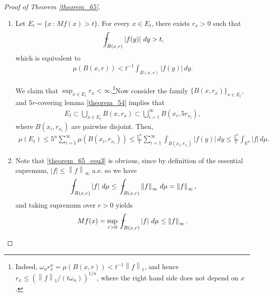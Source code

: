 \documentclass[11pt]{book}
\theoremstyle{definition}
\numberwithin{equation}{chapter}
\def\avint{\,\ThisStyle{\ensurestackMath{%
  \stackinset{c}{.2\LMpt}{c}{1\LMpt}{\SavedStyle-}{\SavedStyle\phantom{\int}}}%
  \setbox0=\hbox{$\SavedStyle\int\,$}\kern-\wd0}\int}
\begin{document}
\begin{proof}[Proof of Theorem \ref{theorem_65}]
~\begin{enumerate}[label=(\alph*)]
    \item Let $E_t = \{x \,:\, Mf(x) > t\}$. For every $x \in E_t$, there exists $r_x > 0$ such that
    \begin{align*}
        \avint_{B(x,r)} \left|f(y)\right| \,dy > t,
    \end{align*}
    which is equivalent to 
    \begin{align*}
        \mu(B(x,r)) < t^{-1} \int_{B(x,r)} \left|f(y)\right| \,dy.
    \end{align*}
    
    We claim that $\sup_{x \in E_t} r_x < \infty$.\footnote{Indeed, $\omega_n r_x^n = \mu(B(x,r)) < t^{-1} \left\|f\right\|_1$, and hence $r_x \leq \left(\left\|f\right\|_1/(t\omega_n)\right)^{1/n}$, where the right hand side does not depend on $x$.}Now consider the family $\{B(x,r_x)\}_{x \in E_t}$, and $5r$-covering lemma \ref{theorem_54} implies that 
    \begin{align*}
        E_t \subset \bigcup_{x\in E_t} B(x,r_x) \subset \bigcup^\infty_{i=1} B(x_i,5r_{x_i}),
    \end{align*}
    where $B(x_i,r_{x_i})$ are pairwise disjoint. Then,
    \begin{align*}
        \mu(E_t) \leq 5^n \sum^\infty_{i=1} \mu(B(x_i,r_{x_i})) \leq \frac{5^n}{t} \sum^\infty_{i=1} \int_{B(x_i,r_{x_i})} \left|f(y)\right| \,dy \leq \frac{5^n}{t} \int_{\mathbb{R}^n} \left|f\right| \,d\mu.
    \end{align*}
    
    \item Note that \eqref{theorem_65_equ3} is obvious, since by definition of the essential supremum, $\left|f\right| \leq \left\|f\right\|_\infty$ a.e. so we have
    \begin{align*}
        \avint_{B(x,r)} \left|f\right| \,d\mu \leq \avint_{B(x,r)} \left\|f\right\|_\infty \,d\mu = \left\|f\right\|_\infty,
    \end{align*}
    and taking supremum over $r > 0$ yields
    \begin{align*}
        Mf(x) = \sup_{r > 0} \avint_{B(x,r)} \left|f\right| \,d\mu \leq \left\|f\right\|_\infty.
    \end{align*}
    

\end{enumerate}
\end{proof}
\end{document}
